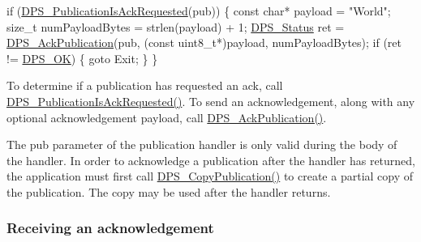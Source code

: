 \begin{DoxyCodeInclude}
    \textcolor{keywordflow}{if} (\hyperlink{group__publication_ga516f7f314c7b95210751d00285758b9b}{DPS\_PublicationIsAckRequested}(pub)) \{
        \textcolor{keyword}{const} \textcolor{keywordtype}{char}* payload = \textcolor{stringliteral}{"World"};
        \textcolor{keywordtype}{size\_t} numPayloadBytes = strlen(payload) + 1;
        \hyperlink{group__status_ga30395a84d3cad9d4ec29848106415038}{DPS\_Status} ret = \hyperlink{group__publication_ga308074429a566ffb8d04d55bae520b04}{DPS\_AckPublication}(pub, (\textcolor{keyword}{const} uint8\_t*)payload, 
      numPayloadBytes);
        \textcolor{keywordflow}{if} (ret != \hyperlink{group__status_ga0ea3dd37bc558859ae0cb5a4f79a4bdd}{DPS\_OK}) \{
            \textcolor{keywordflow}{goto} Exit;
        \}
    \}
\end{DoxyCodeInclude}
 To determine if a publication has requested an ack, call \hyperlink{group__publication_ga516f7f314c7b95210751d00285758b9b}{D\+P\+S\+\_\+\+Publication\+Is\+Ack\+Requested()}. To send an acknowledgement, along with any optional acknowledgement payload, call \hyperlink{group__publication_ga308074429a566ffb8d04d55bae520b04}{D\+P\+S\+\_\+\+Ack\+Publication()}.

The {\ttfamily pub} parameter of the publication handler is only valid during the body of the handler. In order to acknowledge a publication after the handler has returned, the application must first call \hyperlink{group__publication_ga41f31a8b63558e13d73d96de6086e5c4}{D\+P\+S\+\_\+\+Copy\+Publication()} to create a partial copy of the publication. The copy may be used after the handler returns.\hypertarget{tutorials-hello-world_receiving-an-acknowledgement}{}\subsubsection{Receiving an acknowledgement}\label{tutorials-hello-world_receiving-an-acknowledgement}

